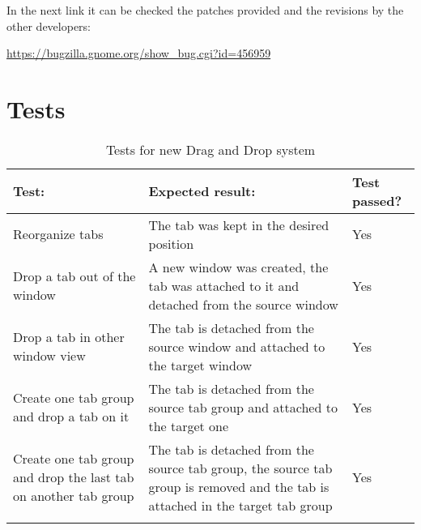In the next link it can be checked the patches provided and the revisions by the other developers:

\noindent\url{https://bugzilla.gnome.org/show_bug.cgi?id=456959}

\newpage
\section{Tests}

\begin{table}[H]
  \begin{center}
    \begin{tabularx}{\textwidth}{|X|X|l|}
      \firsthline
      \textbf{Test:} & \textbf{Expected result:} & \textbf{Test passed?} \\
      \hline
      Reorganize tabs & The tab was kept in the desired position & Yes \\
      \hline
      Drop a tab out of the window & A new window was created, the tab was attached to it and detached from the source window & Yes \\
      \hline
      Drop a tab in other window view & The tab is detached from the source window and attached to the target window & Yes \\
      \hline
      Create one tab group and drop a tab on it & The tab is detached from the source tab group and attached to the target one & Yes \\
      \hline
      Create one tab group and drop the last tab on another tab group & The tab is detached from the source tab group, the source tab group is removed and the tab is attached in the target tab group & Yes \\
      \lasthline
    \end{tabularx}
    \caption{Tests for new Drag and Drop system}
  \end{center}
\end{table}
